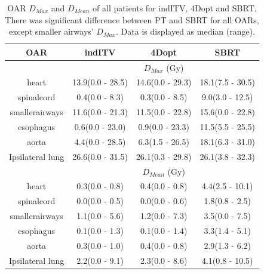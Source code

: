 \documentclass[type=dr, dr=rernat, accentcolor=tud7b,colorbacktitle, bigchapter, openright, twoside, 12pt ]{tudthesis}
\begin{document}
\begin{table}[H]
	\centering
	\caption{OAR $D_{Max}$ and $D_{Mean}$ of all patients for indITV, 4Dopt and SBRT. There was significant difference between PT and SBRT for all OARs, except
	smaller airways' $D_{Max}$. Data is displayed as median (range).}
	\begin{tabular}{c|c|c|c}
		\hline\hline
		 
		OAR &  indITV & 4Dopt & SBRT \\
		\hline
		& \multicolumn{3}{c}{$D_{Max}$ (Gy)}  \\
		\hline
heart & 13.9(0.0 - 28.5) & 14.6(0.0 - 29.3) & 18.1(7.5 - 30.5)\\ 
spinalcord & 0.4(0.0 - 8.3) & 0.3(0.0 - 8.5) & 9.0(3.0 - 12.5)\\ 
smallerairways & 11.6(0.0 - 21.3) & 11.5(0.0 - 22.8) & 15.6(0.0 - 22.8)\\ 
esophagus & 0.6(0.0 - 23.0) & 0.9(0.0 - 23.3) & 11.5(5.5 - 25.5)\\ 
aorta & 4.4(0.0 - 28.5) & 6.3(1.5 - 26.5) & 18.1(6.3 - 31.0)\\ 
Ipsilateral lung & 26.6(0.0 - 31.5) & 26.1(0.3 - 29.8) & 26.1(3.8 - 32.3)\\ 

\hline\hline
& \multicolumn{3}{c}{$D_{Mean}$ (Gy)} \\
\hline

heart & 0.3(0.0 - 0.8) & 0.4(0.0 - 0.8) & 4.4(2.5 - 10.1)\\ 
spinalcord & 0.0(0.0 - 0.5) & 0.0(0.0 - 0.6) & 1.8(0.8 - 2.5)\\ 
smallerairways & 1.1(0.0 - 5.6) & 1.2(0.0 - 7.3) & 3.5(0.0 - 7.5)\\ 
esophagus & 0.1(0.0 - 1.3) & 0.1(0.0 - 1.4) & 3.3(1.4 - 5.1)\\ 
aorta & 0.3(0.0 - 1.0) & 0.4(0.0 - 0.8) & 2.9(1.3 - 6.2)\\ 
Ipsilateral lung & 2.2(0.0 - 9.1) & 2.3(0.0 - 8.6) & 4.1(0.8 - 10.5)\\ 
\hline\hline
	\end{tabular}
	\label{tab:OARComplex}
\end{table}
\end{document}
